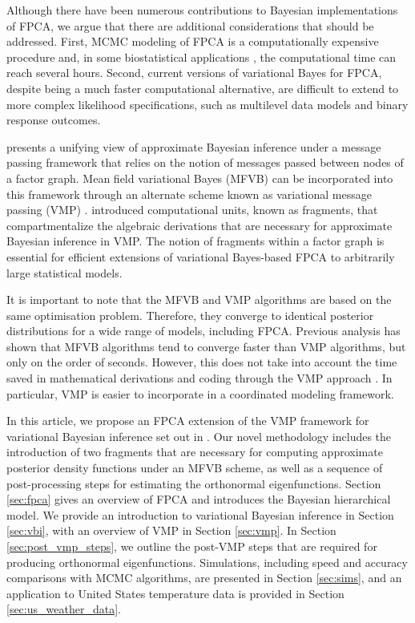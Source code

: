 \documentclass[ba]{imsart}
\numberwithin{equation}{section}
\theoremstyle{plain}
\begin{document}
Although there have been numerous contributions to Bayesian implementations of FPCA, we argue that there are
additional considerations that should be addressed. First, MCMC modeling of FPCA is a computationally expensive
procedure and, in some biostatistical applications \citep{Goldsmith15}, the computational time can reach several
hours. Second, current versions of variational Bayes for FPCA, despite being a much faster computational alternative,
are difficult to extend to more complex likelihood specifications, such as multilevel data models and binary response
outcomes.

\citet{minka05} presents a unifying view of approximate Bayesian inference under a message passing framework
that relies on the notion of messages passed between nodes of a factor graph. Mean field variational Bayes (MFVB)
\citep{ormerod10, blei17}
can be incorporated into this framework through an alternate scheme known as variational message passing (VMP)
\citep{winn05}. \citet{wand17} introduced computational units, known as fragments, that compartmentalize
the algebraic derivations that are necessary for approximate Bayesian inference in VMP. The notion of fragments
within a factor graph is essential for efficient extensions of variational Bayes-based FPCA to arbitrarily large statistical
models.

It is important to note that the MFVB and VMP algorithms are based on the same optimisation problem. Therefore,
they converge to identical posterior distributions for a wide range of models, including FPCA. Previous analysis
\citep{nolanphd20} has shown that MFVB algorithms tend to converge faster than VMP algorithms, but only on the
order of seconds. However, this does not take into account the time saved in mathematical derivations and coding
through the VMP approach \citep{wand17}. In particular, VMP is easier to incorporate in a coordinated modeling
framework.

In this article, we propose an FPCA extension of the VMP framework for variational Bayesian inference set out in
\citet{wand17}. Our novel methodology includes the introduction of two fragments  that are necessary for
computing approximate posterior density functions under an MFVB scheme,
as well as a sequence of post-processing steps for estimating the orthonormal eigenfunctions.
Section \ref{sec:fpca} gives an overview of FPCA and
introduces the Bayesian hierarchical model.
We provide an introduction to
variational Bayesian inference in Section \ref{sec:vbi}, with an overview of VMP in Section \ref{sec:vmp}.
In Section \ref{sec:post_vmp_steps}, we outline the post-VMP steps that are required for
producing orthonormal eigenfunctions. Simulations, including speed and accuracy comparisons with MCMC
algorithms, are presented in Section \ref{sec:sims}, and an application to United States temperature data is
provided in Section \ref{sec:us_weather_data}.
\end{document}
